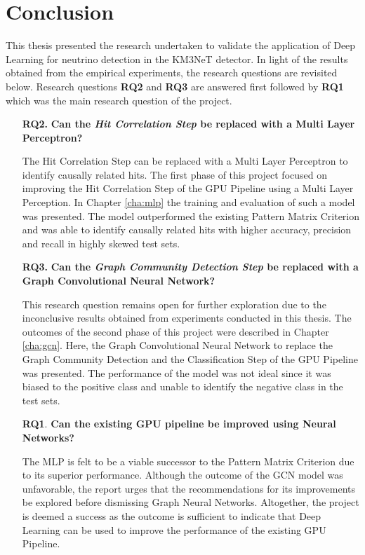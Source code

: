 
\chapter{Conclusion} %

% 

This thesis presented the research undertaken to validate the
application of Deep Learning for neutrino detection in the KM3NeT
detector. In light of the results obtained from the empirical
experiments, the research questions are revisited below. Research
questions \textbf{RQ2} and \textbf{RQ3} are answered first followed by
\textbf{RQ1} which was the main research question of the project.

\begin{enumerate}
\item[\textbf{RQ2.}] \textbf{Can the \emph{Hit Correlation Step} be replaced with a Multi Layer Perceptron?}

  The Hit Correlation Step can be replaced with a Multi Layer
  Perceptron to identify causally related hits. The first phase of
  this project focused on improving the Hit Correlation Step of the
  GPU Pipeline using a Multi Layer Perception. In Chapter
  \ref{cha:mlp} the training and evaluation of such a model was
  presented. The model outperformed the existing Pattern Matrix
  Criterion and was able to identify causally related hits with higher
  accuracy, precision and recall in highly skewed test sets.

\item[\textbf{RQ3.}] \textbf{Can the \emph{Graph Community Detection Step} be replaced with a Graph Convolutional Neural Network?}

  This research question remains open for further exploration due to
  the inconclusive results obtained from experiments conducted in this
  thesis. The outcomes of the second phase of this project were
  described in Chapter \ref{cha:gcn}. Here, the Graph Convolutional
  Neural Network to replace the Graph Community Detection and the
  Classification Step of the GPU Pipeline was presented. The
  performance of the model was not ideal since it was biased to the
  positive class and unable to identify the negative class in the test
  sets.

\item[\textbf{RQ1}.] \textbf{Can the existing GPU pipeline be improved using Neural Networks?}

  The MLP is felt to be a viable successor to the Pattern Matrix
  Criterion due to its superior performance. Although the outcome of
  the GCN model was unfavorable, the report urges that the
  recommendations for its improvements be explored before dismissing
  Graph Neural Networks. Altogether, the project is deemed a success
  as the outcome is sufficient to indicate that Deep Learning can be
  used to improve the performance of the existing GPU Pipeline.
\end{enumerate}

